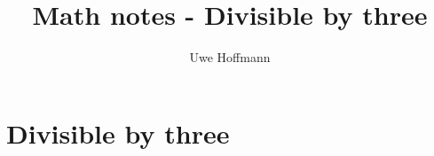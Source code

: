 

\title{Math notes - Divisible by three}
\author{Uwe Hoffmann}



\setcounter{chapter}{1}
\chapter*{Divisible by three}
